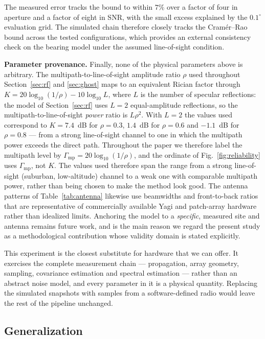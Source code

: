 \documentclass[journal,10pt]{IEEEtran}
\theoremstyle{definition}
\begin{document}
The measured error tracks the bound to within $7\%$ over a factor of four in aperture and a factor
of eight in SNR, with the small excess explained by the $0.1^\circ$ evaluation grid. The simulated
chain therefore closely tracks the Cram\'er--Rao bound across the tested configurations, which
provides an external consistency check on the bearing model under the assumed line-of-sight
condition.

\noindent\textbf{Parameter provenance.} Finally, none of the physical parameters above is
arbitrary. The multipath-to-line-of-sight amplitude ratio $\rho$ used throughout
Section~\ref{sec:rf} and \ref{sec:ghost} maps to an equivalent Rician factor through $K=20\log_{10}(1/\rho)-10\log_{10}L$, where
$L$ is the number of specular reflections: the model of Section~\ref{sec:rf} uses $L=2$
equal-amplitude reflections, so the multipath-to-line-of-sight \emph{power} ratio is $L\rho^2$.
With $L=2$ the values used correspond to $K=7.4$~dB for $\rho=0.3$, $1.4$~dB for $\rho=0.6$ and
$-1.1$~dB for $\rho=0.8$ --- from a strong line-of-sight channel to one in which the multipath
power exceeds the direct path. Throughout the paper we therefore label the multipath level by $\Gamma_{\mathrm{mp}}=20\log_{10}(1/\rho)$, and the ordinate of Fig.~\ref{fig:reliability} uses $\Gamma_{\mathrm{mp}}$, not $K$. The values used therefore span the range from a strong line-of-sight
(suburban, low-altitude) channel to a weak one with comparable multipath power, rather than being
chosen to make the method look good. The antenna patterns of Table~\ref{tab:antenna} likewise use
beamwidths and front-to-back ratios that are representative of commercially available Yagi and
patch-array hardware rather than idealized limits. Anchoring the model to a \emph{specific},
measured site and antenna remains future work, and is the main reason we regard the present study
as a methodological contribution whose validity domain is stated explicitly.

This experiment is the closest substitute for hardware that we can offer. It exercises the
complete measurement chain --- propagation, array geometry, sampling, covariance estimation and
spectral estimation --- rather than an abstract noise model, and every parameter in it is a
physical quantity. Replacing the simulated snapshots with samples from a software-defined radio
would leave the rest of the pipeline unchanged.

\subsection{Generalization}
\end{document}

